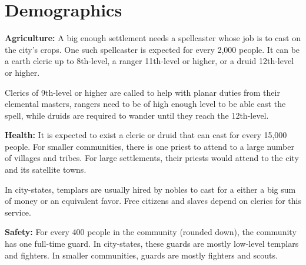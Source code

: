 \section{Demographics}




\textbf{Agriculture:} A big enough settlement needs a spellcaster whose job is to cast  on the city's crops. One such spellcaster is expected for every 2,000 people. It can be a earth cleric up to 8th-level, a ranger 11th-level or higher, or a druid 12th-level or higher.

Clerics of 9th-level or higher are called to help with planar duties from their elemental masters, rangers need to be of high enough level to be able cast the spell, while druids are required to wander until they reach the 12th-level.

\textbf{Health:} It is expected to exist a cleric or druid that can cast  for every 15,000 people. For smaller communities, there is one priest to attend to a large number of villages and tribes. For large settlements, their priests would attend to the city and its satellite towns.

In city-states, templars are usually hired by nobles to cast  for a either a big sum of money or an equivalent favor. Free citizens and slaves depend on clerics for this service.

\textbf{Safety:} For every 400 people in the community (rounded down), the community has one full-time guard. In city-states, these guards are mostly low-level templars and fighters. In smaller communities, guards are mostly fighters and scouts.

